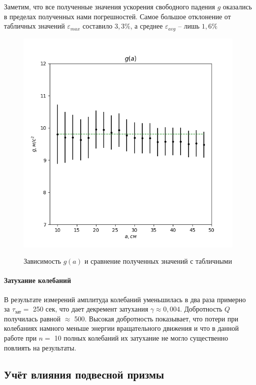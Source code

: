 \documentclass[a4paper,12pt]{article}
\begin{document}
	\noindent
	Заметим, что все полученные значения ускорения свободного падения $g$ оказались в пределах полученных нами погрешностей. Самое большое отклонение от табличных значений $\varepsilon_{max}$ составило $3,3\%$, а среднее $\varepsilon_{avg}$ -- лишь $1,6\%$
	
	\begin{figure}[H]
		\centering
		\caption{Зависимость $g(a)$ и сравнение полученных значений с табличными}
		\includegraphics[width=0.9\linewidth]{fig3}
		\label{fig:fig3}
	\end{figure}
	
	
	\paragraph{Затухание колебаний}
	В результате измерений амплитуда колебаний уменьшилась в два раза примерно за $\tau_{\text{зат}}=$ 250 сек, что дает декремент затухания $\gamma \approx 0,004$. Добротность $Q$ получилась равной $\approx$ 500. Высокая добротность показывает, что потери при колебаниях намного меньше энергии вращательного движения и что в данной работе при $n =$ 10 полных колебаний их затухание не могло существенно повлиять на результаты.
	
	\subsection{Учёт влияния подвесной призмы}
	
\end{document}

